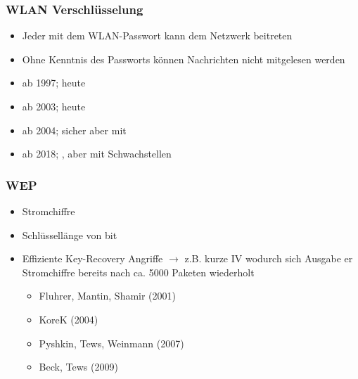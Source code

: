 \subsubsection*{WLAN Verschlüsselung}
\begin{itemize}
    \item Jeder mit dem WLAN-Passwort kann dem Netzwerk beitreten
    \item Ohne Kenntnis des Passworts können Nachrichten nicht mitgelesen werden
\end{itemize}
\begin{itemize}
    \item {} ab 1997; heute 
    \item {} ab 2003; heute 
    \item {} ab 2004; sicher aber mit 
    \item {} ab 2018; , aber mit Schwachstellen
\end{itemize}
\subsubsection*{WEP}
\begin{itemize}
    \item Stromchiffre 
    \item Schlüssellänge von  bit
    \item Effiziente Key-Recovery Angriffe $\rightarrow$  z.B. kurze IV wodurch sich Ausgabe er Stromchiffre  bereits nach ca. 5000 Paketen wiederholt
    \begin{itemize}
        \item Fluhrer, Mantin, Shamir (2001)
        \item KoreK (2004)
        \item Pyshkin, Tews, Weinmann (2007)
        \item Beck, Tews (2009)
    \end{itemize}
\end{itemize}
